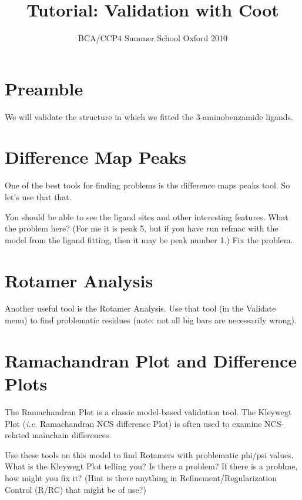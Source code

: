 \documentclass{article}
\title{Tutorial: Validation with Coot}
\author{BCA/CCP4 Summer School Oxford 2010}
\begin{document}
\maketitle

\section{Preamble}

  We will validate the structure in which we fitted the
  3-aminobenzamide ligands.

\section{Difference Map Peaks}

  One of the best tools for finding problems is the difference maps
  peaks tool. So let's use that that.  

  You should be able to see the ligand sites and other interesting
  features. What the problem here? (For me it is peak 5, but if you
  have run refmac with the model from the ligand fitting, then it may
  be peak number 1.)  Fix the problem.

\section{Rotamer Analysis}
 
Another useful tool is the Rotamer Analysis.  Use that tool (in the
\textsf{Validate} menu) to find problematic residues (note: not all
big bars are necessarily wrong).





\section{Ramachandran Plot and Difference Plots}

The Ramachandran Plot is a classic model-based validation tool.  The
Kleywegt Plot (\emph{i.e.} Ramachandran NCS difference Plot) is often
used to examine NCS-related mainchain differences.

Use these tools on this model to find Rotamers with problematic
phi/psi values.  What is the Kleywegt Plot telling you? Is there a
problem? If there is a problme, how might you fix it? (Hint is there
anything in Refinement/Regularization Control (R/RC) that might be of
use?)
\end{document}
